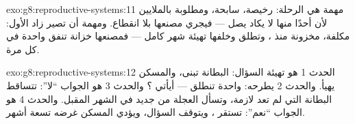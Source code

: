 \begin{solution}{exo:g8:reproductive-systems:11}
مهمة  هي الرحلة: رخيصة، سابحة، ومطلوبة بالملايين
لأن أحدًا منها لا يكاد يصل --- فيجري مصنعها بلا انقطاع.
ومهمة  أن تصير زاد  الأول: مكلفة، مخزونة
منذ ، وتطلق وخلفها تهيئة شهر كامل --- فمصنعها
خزانة تنفق واحدة في كل مرة.
\end{solution}

\begin{solution}{exo:g8:reproductive-systems:12}
الحدث 1 هو تهيئة السؤال: البطانة تبنى، والمسكن يهيأ.
والحدث 2 يطرحه:  واحدة تنطلق --- أيأتي ؟
والحدث 3 هو الجواب ``لا'': تتساقط البطانة التي لم تعد
لازمة، وتسأل العجلة من جديد في الشهر المقبل. والحدث 4 هو
الجواب ``نعم'': تستقر ، ويتوقف السؤال، ويؤدي
المسكن غرضه تسعة أشهر.
\end{solution}

